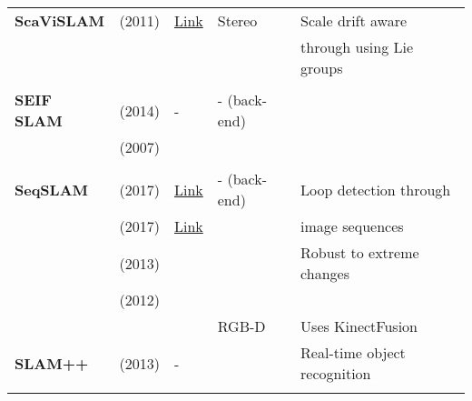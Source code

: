 \documentclass[a4paper,12pt]{scrartcl}
\begin{document}
{\begin{longtable}{l|l|l|l|l}
    \textbf{ScaViSLAM}     & \cite{Strasdat2011} (2011)        & {\href{https://github.com/strasdat/ScaViSLAM}{Link}}               & Stereo                & Scale drift aware\\
                           &                                   &                                                                    &                       & through using Lie groups\\
                           &                                   &                                                                    &                       &\\
    \textbf{SEIF SLAM}     & \cite{Torres-Gonzalez2014} (2014) & -                                                                  & - (back-end)          &\\
                           & \cite{Walter2007} (2007)          &                                                                    &                       &\\
                           &                                   &                                                                    &                       &\\
    \textbf{SeqSLAM}       & \cite{bai2017} (2017)             & {\href{https://github.com/subokita/OpenSeqSLAM}{Link}}             & - (back-end)          & Loop detection through\\
                           & \cite{Siam2017} (2017)            & {\href{https://github.com/siam1251/Fast-SeqSLAM}{Link}}            &                       & image sequences\\
                           & \cite{Sunderhauf2013} (2013)      &                                                                    &                       & Robust to extreme changes\\
                           & \cite{Milford2012} (2012)         &                                                                    &                       &\\
                           &                                   &                                                                    & RGB-D                 & Uses KinectFusion\\
    \textbf{SLAM++}        & \cite{Salas-moreno2013} (2013)    & -                                                                  &                       & Real-time object recognition\\
                           &                                   &                                                                    &                       &\\

\end{longtable}}
\end{document}
